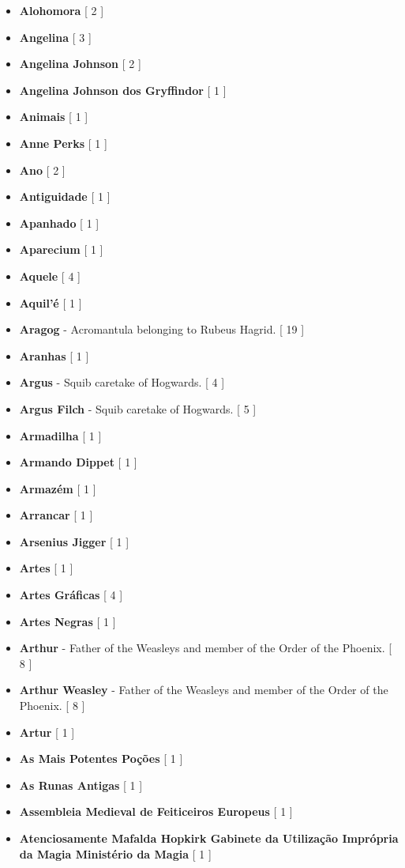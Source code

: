 \documentclass[a4paper]{article}
\begin{document}
{\begin{itemize}
	\item \textbf{Alohomora} [ 2 ]
	\item \textbf{Angelina} [ 3 ]
	\item \textbf{Angelina Johnson} [ 2 ]
	\item \textbf{Angelina Johnson dos Gryffindor} [ 1 ]
	\item \textbf{Animais} [ 1 ]
	\item \textbf{Anne Perks} [ 1 ]
	\item \textbf{Ano} [ 2 ]
	\item \textbf{Antiguidade} [ 1 ]
	\item \textbf{Apanhado} [ 1 ]
	\item \textbf{Aparecium} [ 1 ]
	\item \textbf{Aquele} [ 4 ]
	\item \textbf{Aquil'é} [ 1 ]
	\item \textbf{Aragog} - Acromantula belonging to Rubeus Hagrid. [ 19 ]
	\item \textbf{Aranhas} [ 1 ]
	\item \textbf{Argus} - Squib caretake of Hogwards. [ 4 ]
	\item \textbf{Argus Filch} - Squib caretake of Hogwards. [ 5 ]
	\item \textbf{Armadilha} [ 1 ]
	\item \textbf{Armando Dippet} [ 1 ]
	\item \textbf{Armazém} [ 1 ]
	\item \textbf{Arrancar} [ 1 ]
	\item \textbf{Arsenius Jigger} [ 1 ]
	\item \textbf{Artes} [ 1 ]
	\item \textbf{Artes Gráficas} [ 4 ]
	\item \textbf{Artes Negras} [ 1 ]
	\item \textbf{Arthur} - Father of the Weasleys and member of the Order of the Phoenix. [ 8 ]
	\item \textbf{Arthur Weasley} - Father of the Weasleys and member of the Order of the Phoenix. [ 8 ]
	\item \textbf{Artur} [ 1 ]
	\item \textbf{As Mais Potentes Poções} [ 1 ]
	\item \textbf{As Runas Antigas} [ 1 ]
	\item \textbf{Assembleia Medieval de Feiticeiros Europeus} [ 1 ]
	\item \textbf{Atenciosamente Mafalda Hopkirk Gabinete da Utilização Imprópria da Magia Ministério da Magia} [ 1 ]

\end{itemize}}
\end{document}

